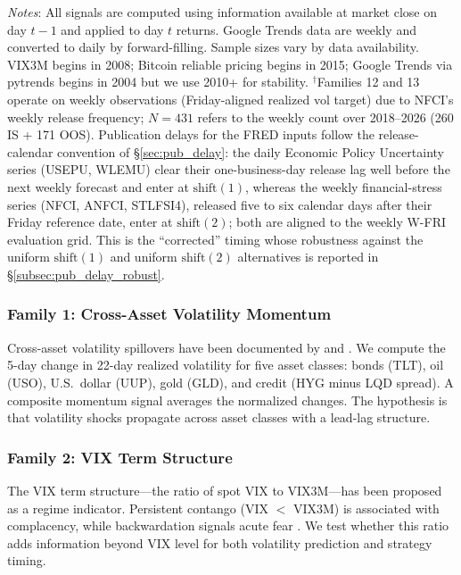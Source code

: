 \documentclass[12pt,a4paper]{article}
\begin{document}
\begin{table}[H]
\begin{threeparttable}
\begin{tablenotes}
\small
\item \textit{Notes}: All signals are computed using information available at market close on day $t-1$ and applied to day $t$ returns. Google Trends data are weekly and converted to daily by forward-filling. Sample sizes vary by data availability. VIX3M begins in 2008; Bitcoin reliable pricing begins in 2015; Google Trends via pytrends begins in 2004 but we use 2010+ for stability. $^\dagger$Families 12 and 13 operate on weekly observations (Friday-aligned realized vol target) due to NFCI's weekly release frequency; $N=431$ refers to the weekly count over 2018--2026 (260 IS + 171 OOS). Publication delays for the FRED inputs follow the release-calendar convention of \S\ref{sec:pub_delay}: the daily Economic Policy Uncertainty series (USEPU, WLEMU) clear their one-business-day release lag well before the next weekly forecast and enter at $\text{shift}(1)$, whereas the weekly financial-stress series (NFCI, ANFCI, STLFSI4), released five to six calendar days after their Friday reference date, enter at $\text{shift}(2)$; both are aligned to the weekly W-FRI evaluation grid. This is the ``corrected'' timing whose robustness against the uniform $\text{shift}(1)$ and uniform $\text{shift}(2)$ alternatives is reported in \S\ref{subsec:pub_delay_robust}.
\end{tablenotes}
\end{threeparttable}
\end{table}

\subsubsection{Family 1: Cross-Asset Volatility Momentum}

Cross-asset volatility spillovers have been documented by \citet{diebold2012} and \citet{barunik2016}. We compute the 5-day change in 22-day realized volatility for five asset classes: bonds (TLT), oil (USO), U.S.\ dollar (UUP), gold (GLD), and credit (HYG minus LQD spread). A composite momentum signal averages the normalized changes. The hypothesis is that volatility shocks propagate across asset classes with a lead-lag structure.

\subsubsection{Family 2: VIX Term Structure}

The VIX term structure---the ratio of spot VIX to VIX3M---has been proposed as a regime indicator. Persistent contango (VIX $<$ VIX3M) is associated with complacency, while backwardation signals acute fear \citep{luo2019}. We test whether this ratio adds information beyond VIX level for both volatility prediction and strategy timing.
\end{document}
